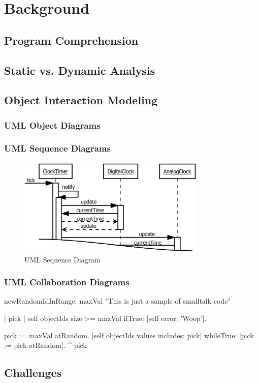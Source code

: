 \chapter{Background}
\label{c:Background}

\section{Program Comprehension}

\section{Static vs. Dynamic Analysis}

\section{Object Interaction Modeling}
\subsection{UML Object Diagrams}
\subsection{UML Sequence Diagrams}

\begin{figure}
	\centering
	\includegraphics[width=0.8\textwidth]{../images/02-Sequence}
	\caption[TOC Caption]{UML Sequence Diagram}
	\label{fig:ModelingSequence}
\end{figure}


\subsection{UML Collaboration Diagrams}

\begin{smalltalk}[float=htbp,caption=Smalltalk Sample]
newRandomIdInRange: maxVal
	"This is just a sample of smalltalk code"
	
	| pick |
	self objectIds size >= maxVal ifTrue: [self error: 'Woop'].
	
	pick := maxVal atRandom.
	[self objectIds values includes: pick] 
		whileTrue: [pick := pick atRandom].
	^  pick
\end{smalltalk}

\section{Challenges}
